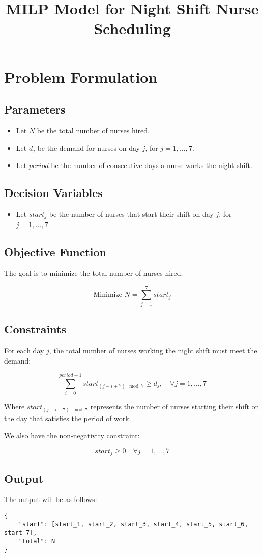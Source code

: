 \documentclass{article}
\begin{document}
\title{MILP Model for Night Shift Nurse Scheduling}
\author{}
\date{}
\maketitle

\section*{Problem Formulation}

\subsection*{Parameters}
\begin{itemize}
    \item Let $N$ be the total number of nurses hired.
    \item Let $d_j$ be the demand for nurses on day $j$, for $j = 1, \ldots, 7$.
    \item Let $period$ be the number of consecutive days a nurse works the night shift.
\end{itemize}

\subsection*{Decision Variables}
\begin{itemize}
    \item Let $start_j$ be the number of nurses that start their shift on day $j$, for $j = 1, \ldots, 7$.
\end{itemize}

\subsection*{Objective Function}
The goal is to minimize the total number of nurses hired:

\[
\text{Minimize } N = \sum_{j=1}^{7} start_j
\]

\subsection*{Constraints}
For each day $j$, the total number of nurses working the night shift must meet the demand:

\[
\sum_{i=0}^{period - 1} start_{(j - i + 7) \mod 7} \geq d_j, \quad \forall j = 1, \ldots, 7
\]

Where $start_{(j - i + 7) \mod 7}$ represents the number of nurses starting their shift on the day that satisfies the period of work.

We also have the non-negativity constraint:

\[
start_j \geq 0 \quad \forall j = 1, \ldots, 7
\]

\subsection*{Output}
The output will be as follows:

\begin{verbatim}
{
    "start": [start_1, start_2, start_3, start_4, start_5, start_6, start_7],
    "total": N
}
\end{verbatim}
\end{document}
